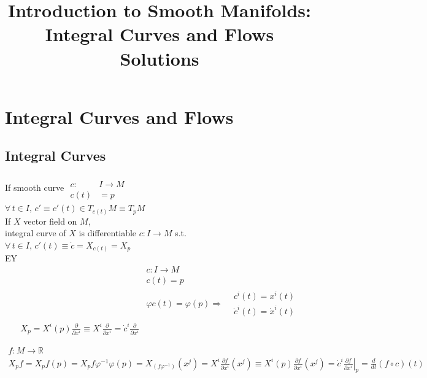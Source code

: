 \documentclass[11pt]{amsart}
\title{Introduction to Smooth Manifolds: Integral Curves and Flows Solutions}
\theoremstyle{definition}
\begin{document}
\maketitle
\section{Integral Curves and Flows }



\subsection*{Integral Curves }

If smooth curve $ \begin{aligned} & \quad \\
 c:  & I \to M \\
 c(t) & = p \end{aligned}$ \\
$\forall \, t \in I ,  \, c' \equiv c'(t) \in T_{c(t)}M \equiv T_p M$ \\

If $X$ vector field on $M$, \\
integral curve of $X$ is differentiable $c: I  \to M$ s.t. \\
\quad $\forall \, t \in I$, $c'(t) \equiv \dot{c} = X_{c(t)} = X_p$  \\

EY  \\
\[
\begin{aligned}
  & c:I \to M \\
  & c(t) = p  \\
  & \varphi c(t) = \varphi(p) \Longrightarrow \begin{aligned} & c^i(t) = x^i(t) \\
    & \dot{c}^i(t) = \dot{x}^i(t) \end{aligned} \\
  X_p = X^i(p) \frac{ \partial }{ \partial x^i } \equiv X^i \frac{ \partial }{ \partial x^i } = \dot{c}^i \frac{ \partial }{ \partial x^i }
\end{aligned}
\]

\[
\begin{gathered}
  f: M \to \mathbb{R} \\
  X_p f = X_p f(p) = X_pf \varphi^{-1} \varphi(p) = X_(f\varphi^{-1})(x^j) = X^i \frac{ \partial f}{ \partial x^i }(x^j) \equiv X^i(p)  \frac{ \partial f}{ \partial x^i}(x^j) = \dot{c}^i \left. \frac{ \partial f}{ \partial x^i} \right|_p = \frac{d}{dt}( f \circ c)(t)
\end{gathered}
\]
\end{document}
